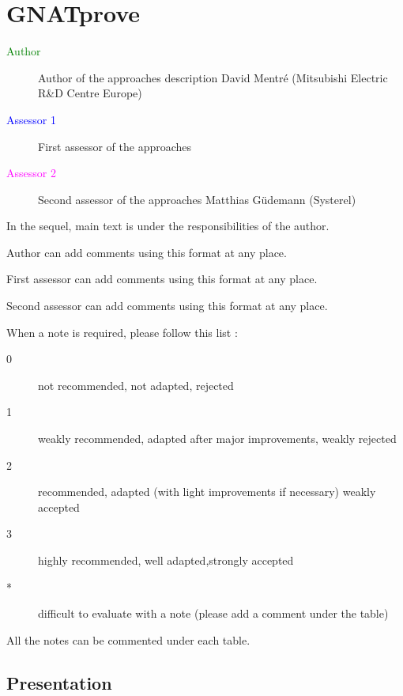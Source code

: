 \chapter{GNATprove}

\begin{description}
\item[\textcolor{green}{Author}] Author of the approaches description
  David Mentré (Mitsubishi Electric R\&D Centre Europe)
\item[\textcolor{blue}{Assessor 1}] First assessor of the approaches 
\item[\textcolor{magenta}{Assessor 2}] Second assessor of the approaches Matthias G\"udemann (Systerel)
\end{description}

In the sequel, main text is under the responsibilities of the author.

\begin{author_comment}
Author can add comments using this format at any place.
\end{author_comment}

\begin{assessor1}
First assessor can add comments using this format at any place.
\end{assessor1}

\begin{assessor2}
Second assessor can add comments using this format at any place.
\end{assessor2}

When a note is required, please follow this list :
\begin{description}
\item[0] not recommended, not adapted, rejected
\item[1] weakly recommended, adapted after major improvements, weakly rejected
\item[2] recommended, adapted (with light improvements if necessary)  weakly accepted
\item[3] highly recommended, well adapted,strongly accepted
\item[*] difficult to evaluate with a note (please add a comment under the table)
\end{description}

All the notes can be commented under each table.

\section{Presentation}

